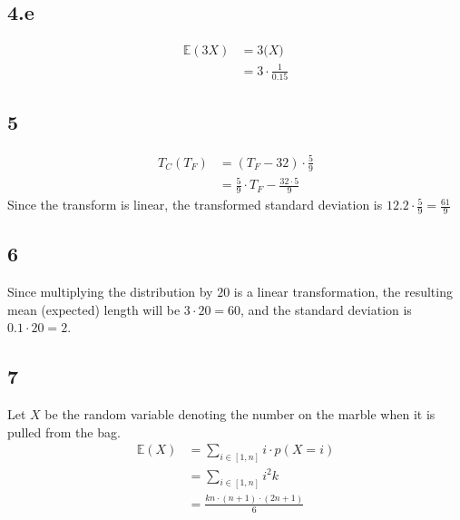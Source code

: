 \documentclass{article}
\begin{document}
\subsection*{4.e}
\begin{align*}
	\mathbb{E}(3X) &= 3 \mathbb(X)\\
								 &= 3 \cdot \frac{1}{0.15}
\end{align*}

\subsection*{5}
\begin{align*}
	T_C(T_F) &= (T_F - 32) \cdot \frac{5}{9}\\
					 &= \frac{5}{9} \cdot T_F - \frac{32\cdot 5}{9}
\end{align*}
Since the transform is linear, the transformed standard deviation is $12.2 \cdot
\frac{5}{9} = \frac{61}{9}$

\subsection*{6} Since multiplying the distribution by $20$ is a linear
transformation, the resulting mean (expected) length will be $3 \cdot 20 = 60$,
and the standard deviation is $0.1 \cdot 20 = 2$.

\subsection*{7}
Let $X$ be the random variable denoting the number on the marble when it is pulled
from the bag.
\begin{align*}
	\mathbb{E}(X) &= \sum_{i \in [1, n]} i \cdot p(X=i)\\
								&= \sum_{i \in [1, n]} i^2k\\
								&= \frac{kn \cdot (n+1) \cdot (2n+1)}{6}
\end{align*}
\end{document}
